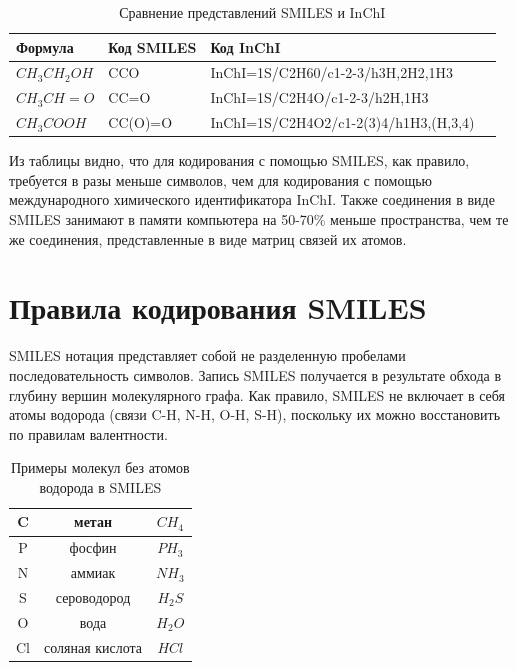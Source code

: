 \documentclass[a4paper,14pt]{extreport}
\begin{document}
\begin{table}[H]
\caption{Сравнение представлений SMILES и InChI}
\begin{center}
\begin{tabular}{|l|l|l|l|}
\hline
	Формула & Код SMILES & Код InChI\\
\hline
	$CH_3CH_2OH$ & CCO & InChI=1S/C2H60/c1-2-3/h3H,2H2,1H3\\
\hline
	$CH_3CH=O$ & CC=O & InChI=1S/C2H4O/c1-2-3/h2H,1H3\\
\hline
	$CH_3COOH$ & CC(O)=O & InChI=1S/C2H4O2/c1-2(3)4/h1H3,(H,3,4)\\
\hline
\end{tabular}
\end{center}
\end{table}


Из таблицы видно, что для кодирования с помощью SMILES, как правило, требуется в разы меньше символов, чем для кодирования с помощью международного химического идентификатора InChI. Также соединения в виде SMILES занимают в памяти компьютера на 50-70\% меньше пространства, чем те же соединения, представленные в виде матриц связей их атомов.

  \section{Правила кодирования SMILES}
  \label{s:smiles_coding_sec}
  SMILES нотация представляет собой не разделенную пробелами последовательность символов. Запись SMILES получается в результате обхода в глубину вершин молекулярного графа.
Как правило, SMILES не включает в себя атомы водорода (связи C-H, N-H, O-H, S-H), поскольку их можно восстановить по правилам валентности.
\newpage
\begin{table}[H]
\caption{Примеры молекул без атомов водорода в SMILES}
\begin{center}
\begin{tabular}{|c|c|c|}
\hline
	C & метан & $CH_4$\\
\hline
	P & фосфин & $PH_3$\\
\hline
	N & аммиак & $NH_3$\\
\hline
	S & сероводород & $H_2S$\\
\hline
	O & вода & $H_2O$\\
\hline
	Cl & соляная кислота & $HCl$\\
\hline
\end{tabular}
\end{center}
\end{table}
\end{document}
